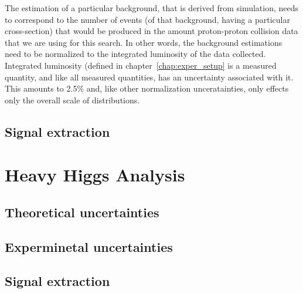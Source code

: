 The estimation of a particular background, that is derived from simulation, needs to correspond to the number of events (of that background, having a particular cross-section) that would be produced in the amount proton-proton collision data that we are using for this search. In other words, the background estimations need to be normalized to the integrated luminosity of the data collected. Integrated luminosity (defined in chapter~\ref{chap:exper_setup} is a measured quantity, and like all measured quantities, has an uncertainty associated with it. This amounts to 2.5\% and, like other normalization unceratainties, only effects only the overall scale of distributions.  







\subsection{Signal extraction}
\label{sig_ext}


\section{Heavy Higgs Analysis}
\label{hh_sys}

\subsection{Theoretical uncertainties}
\label{theo_uncert}

\subsection{Experminetal uncertainties}
\label{exp_uncert}

\subsection{Signal extraction}
\label{sig_ext}

%
% 
% 


